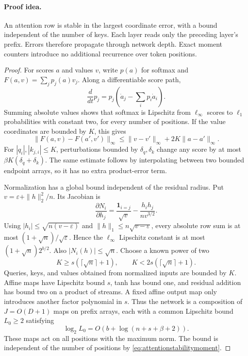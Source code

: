 \paragraph{Proof idea.}
An attention row is stable in the largest coordinate error, with
a bound independent of the number of keys.  Each layer reads only
the preceding layer's prefix.  Errors therefore propagate through
network depth.  Exact moment counters introduce no additional
recurrence over token positions.

\begin{proof}
For scores $a$ and values $v$, write $p(a)$ for softmax and
$F(a,v)=\sum_j p_j(a)v_j$.  Along a differentiable score path,
\[
 \frac{d}{dt}p_j=p_j\left(\dot a_j-\sum_i p_i\dot a_i\right).
\]
Summing absolute values shows that softmax is Lipschitz from
$\ell_\infty$ scores to $\ell_1$ probabilities with constant
two, for every number of positions.  If the value coordinates
are bounded by $K$, this gives
\begin{equation}
 \|F(a,v)-F(a',v')\|_\infty
 \le\|v-v'\|_\infty+2K\|a-a'\|_\infty.
 \label{eq:attentionstabilitymoment}
\end{equation}
For $|q_i|,|k_{j,i}|\le K$, perturbations bounded by
$\delta_q,\delta_k$ change any score by at most
$\beta K(\delta_q+\delta_k)$.  The same estimate follows by
interpolating between two bounded endpoint arrays, so it has no
extra product-error term.

Normalization has a global bound independent of the residual
radius.  Put $v=\varepsilon+\|h\|_2^2/n$.  Its Jacobian is
\[
 \frac{\partial N_i}{\partial h_j}
 =\frac{\mathbf1_{i=j}}{\sqrt v}
       -\frac{h_i h_j}{n v^{3/2}}.
\]
Using $|h_i|\le\sqrt{n(v-\varepsilon)}$ and
$\|h\|_1\le n\sqrt{v-\varepsilon}$, every absolute row sum
is at most $(1+\sqrt n)/\sqrt\varepsilon$.  Hence the
$\ell_\infty$ Lipschitz constant is at most
$(1+\sqrt n)2^{b/2}$.  Also $|N_i(h)|\le\sqrt n$.
Choose a known power of two
\[
 K\ge s(\lceil\sqrt n\rceil+1),\qquad
 K<2s(\lceil\sqrt n\rceil+1).
\]
Queries, keys, and values obtained from normalized inputs are
bounded by $K$.  Affine maps have Lipschitz bound $s$, tanh has
bound one, and residual addition has bound two on a product of
streams.  A fixed affine output map only introduces another
factor polynomial in $s$.  Thus the network is a composition of
$J=O(D+1)$ maps on prefix arrays, each with a common Lipschitz
bound $L_0\ge2$ satisfying
\[
 \log_2 L_0=O(b+\log(n+s+\beta+2)).
\]
These maps act on all positions with the maximum norm.  The bound
is independent of the number of positions by
\eqref{eq:attentionstabilitymoment}.


\end{proof}
